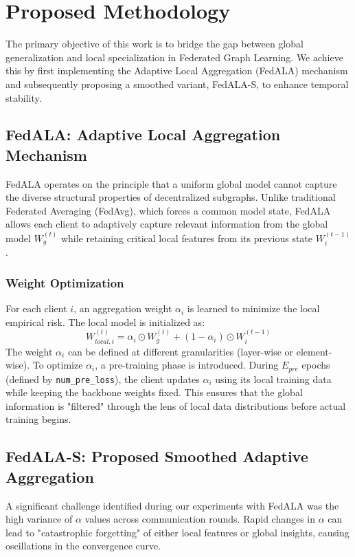 \documentclass[10pt,conference,compsocconf,letterpaper]{IEEEtran}
\begin{document}
\section{Proposed Methodology}

The primary objective of this work is to bridge the gap between global generalization and local specialization in Federated Graph Learning. We achieve this by first implementing the Adaptive Local Aggregation (FedALA) mechanism and subsequently proposing a smoothed variant, FedALA-S, to enhance temporal stability.

\subsection{FedALA: Adaptive Local Aggregation Mechanism}
FedALA operates on the principle that a uniform global model cannot capture the diverse structural properties of decentralized subgraphs. Unlike traditional Federated Averaging (FedAvg), which forces a common model state, FedALA allows each client to adaptively capture relevant information from the global model $W_g^{(t)}$ while retaining critical local features from its previous state $W_i^{(t-1)}$.

\subsubsection{Weight Optimization}
For each client $i$, an aggregation weight $\alpha_i$ is learned to minimize the local empirical risk. The local model is initialized as:
\begin{equation}
W_{local, i}^{(t)} = \alpha_i \odot W_g^{(t)} + (1 - \alpha_i) \odot W_i^{(t-1)}
\end{equation}
The weight $\alpha_i$ can be defined at different granularities (layer-wise or element-wise). To optimize $\alpha_i$, a pre-training phase is introduced. During $E_{pre}$ epochs (defined by \texttt{num\_pre\_loss}), the client updates $\alpha_i$ using its local training data while keeping the backbone weights fixed. This ensures that the global information is "filtered" through the lens of local data distributions before actual training begins.

\subsection{FedALA-S: Proposed Smoothed Adaptive Aggregation}
A significant challenge identified during our experiments with FedALA was the high variance of $\alpha$ values across communication rounds. Rapid changes in $\alpha$ can lead to "catastrophic forgetting" of either local features or global insights, causing oscillations in the convergence curve.
\end{document}
